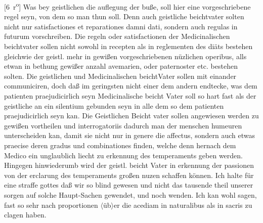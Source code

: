 [6~r\textsuperscript{o}]
\pend
\count{}
\pstart%
Was bey geistlichen die auflegung der bu{\ss}e, soll hier eine vorgeschriebene regel seyn, von dem so man thun soll.
\pend%
\pstart%
Denn auch geistliche beichtvater solten nicht nur satisfactiones et reparationes damni dati, sondern auch regulas in futurum vorschreiben.
\pend%
\pstart%
Die regeln oder satisfactionen der Medicinalischen beichtvater\protect{} sollen nicht sowohl in recepten\protect{} als in reglementen des di\"{a}ts\protect{} bestehen gleichwie der geistl. mehr in gewi{\ss}en vorgeschriebenen n\"{u}zlichen operibus, alls etwan in bethung gewi{\ss}er anzahl avemarien, oder paternoster etc. bestehen solten.
\pend%
\pstart%
Die geistlichen und Medicinalischen beichtVater\protect{} sollen mit einander communiciren, doch da{\ss} im geringsten nicht einer dem andern endtecke, was dem patienten\protect{} praejudicirlich seyn
Medicinalische beicht Vater\protect{} soll so hart fast als der geistliche an ein silentium gebunden seyn in alle dem so dem patienten\protect{} praejudicirlich seyn kan.
\pend%
\pstart%
Die Geistlichen Beicht vater sollen angewiesen werden zu gewi{\ss}en vortheilen und interrogatoriis dadurch man der menschen humeuren\protect{} unterscheiden kan, damit sie nicht nur in genere die affectus\protect{}, sondern auch etwas praecise deren gradus und combinationes finden, welche denn hernach dem Medico\protect{} ein unglaublich liecht zu erkennung des temperaments\protect{} geben werden.
\pend%
\pstart%
Hingegen hinwiederumb wird der geistl. beicht Vater in erkennung der passionen von der erclarung des temperaments\protect{} gro{\ss}en nuzen schaffen k\"{o}nnen.
\pend%
\pstart%
Ich halte f\"{u}r eine straffe gottes da{\ss} wir so blind
gewesen und nicht das tausende theil unserer sorgen auf solche Haupt-Sachen gewendet, und noch wenden. Ich kan wohl sagen,
fast so sehr nach proportionen $\langle$\"{u}b$\rangle$er die acediam in naturalibus als in sacris zu clagen haben.%
